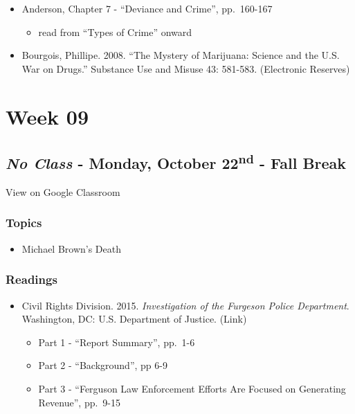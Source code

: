 \documentclass[]{book}
\providecommand{\tightlist}{%
  \setlength{\itemsep}{0pt}\setlength{\parskip}{0pt}}
\theoremstyle{definition}
\theoremstyle{definition}
\theoremstyle{definition}
\theoremstyle{remark}
\begin{document}
\begin{itemize}
\tightlist
\item
  Anderson, Chapter 7 - ``Deviance and Crime'', pp.~160-167

  \begin{itemize}
  \tightlist
  \item
    read from ``Types of Crime'' onward
  \end{itemize}
\item
  Bourgois, Phillipe. 2008. ``The Mystery of Marijuana: Science and the
  U.S. War on Drugs.'' Substance Use and Misuse 43: 581-583. (Electronic
  Reserves)
\end{itemize}

\hypertarget{week-09}{%
\section*{Week 09}\label{week-09}}

\hypertarget{no-class---monday-october-22nd---fall-break}{%
\subsection*{\texorpdfstring{\emph{No Class} - Monday, October
22\textsuperscript{nd} - Fall
Break}{No Class - Monday, October 22nd - Fall Break}}\label{no-class---monday-october-22nd---fall-break}}

View on Google Classroom

\hypertarget{topics-16}{%
\subsubsection*{Topics}\label{topics-16}}

\begin{itemize}
\tightlist
\item
  Michael Brown's Death
\end{itemize}

\hypertarget{readings-15}{%
\subsubsection*{Readings}\label{readings-15}}

\begin{itemize}
\tightlist
\item
  Civil Rights Division. 2015. \emph{Investigation of the Furgeson
  Police Department}. Washington, DC: U.S. Department of Justice. (Link)

  \begin{itemize}
  \tightlist
  \item
    Part 1 - ``Report Summary'', pp.~1-6
  \item
    Part 2 - ``Background'', pp 6-9
  \item
    Part 3 - ``Ferguson Law Enforcement Efforts Are Focused on
    Generating Revenue'', pp.~9-15
  \end{itemize}
\end{itemize}
\end{document}
